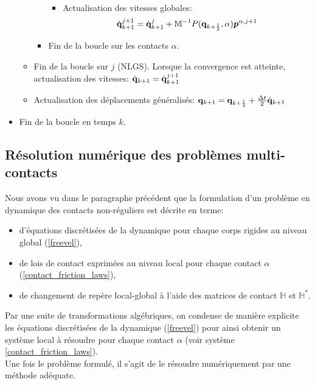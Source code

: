 \begin{itemize}
\begin{itemize}
\begin{itemize}
\begin{itemize}
\begin{eqnarray}
\label{18}
\end{eqnarray}
\item Actualisation des vitesses globales:
\begin{equation}\label{new_vel}
\dot{\bf{q}}^{j+1}_{k+1}=\dot{\bf{q}}_{k+1}^{j}+{\mathbb M}^{-1}P({\bf q}_{k+\frac12},\alpha) \boldsymbol{p}^{\alpha,j+1}
\end{equation}
\end{itemize}
\item Fin de la boucle sur les contacts $\alpha$.
\end{itemize}
\item Fin de la boucle sur $j$ (NLGS). Lorsque la convergence est atteinte, actualisation des vitesses: $\dot{\bf{q}}_{k+1}=\dot{\bf{q}}_{k+1}^{j+1}$
\item Actualisation des déplacements généralisés: ${\bf q}_{k+1}={\bf q}_{k+\frac12}+\frac{\Delta t}{2}\dot{\bf{q}}_{k+1}$
\end{itemize}
\item Fin de la boucle en temps $k$.
\end{itemize}

\subsection{Résolution numérique des problèmes multi-contacts}

Nous avons vu dans le paragraphe précédent que la formulation d'un problème en dynamique des contacts non-réguliers est décrite en terme:

\begin{itemize}
    \item d'équations discrétisées de la dynamique pour chaque corps rigides au niveau global (\ref{freevel}),
    \item de lois de contact exprimées au niveau local pour chaque contact $\alpha$ (\ref{contact_friction_laws}),
    \item de changement de repère local-global à l'aide des matrices de contact $\mathbb{H}$ et $\mathbb{H}^{*}$.
\end{itemize}

Par une suite de transformations algébriques, on condense de manière explicite les équations discrétisées de la dynamique (\ref{freevel}) pour ainsi obtenir un système local à résoudre pour chaque contact $\alpha$ (voir système \ref{contact_friction_laws}).\\
Une fois le problème formulé, il s'agit de le résoudre numériquement par une méthode adéquate.

